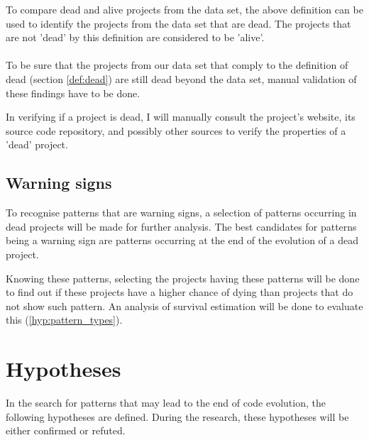 To compare dead and alive projects from the data set, the above definition can
be used to identify the projects from the data set that are dead. The projects
that are not 'dead' by this definition are considered to be 'alive'.

\paragraph{}
To be sure that the projects from our data set that comply to the definition of
dead (section \ref{def:dead}) are still dead beyond the data set, manual
validation of these findings have to be done.

In verifying if a project is dead, I will manually consult the project's
website, its source code repository, and possibly other sources to verify the
properties of a 'dead' project.

\subsection{Warning signs}
To recognise patterns that are warning signs, a selection of patterns occurring
in dead projects will be made for further analysis. The best candidates for
patterns being a warning sign are patterns occurring at the end of the
evolution of a dead project.

Knowing these patterns, selecting the projects having these patterns will be
done to find out if these projects have a higher chance of dying than projects
that do not show such pattern. An analysis of survival estimation will be done
to evaluate this (\ref{hyp:pattern_types}).

\section{Hypotheses}
In the search for patterns that may lead to the end of code evolution, the
following hypotheses are defined. During the research, these hypotheses will be
either confirmed or refuted.

